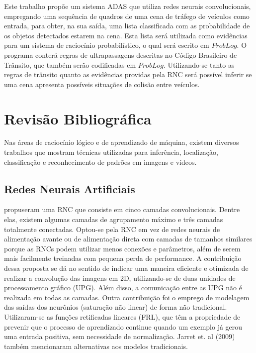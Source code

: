 \documentclass[
	12pt,				%
    oneside,			%
	a4paper,			%
	english,			%
	french,				%
	spanish,			%
	brazil,				%
	]{abntex2}
\begin{document}
Este trabalho propõe um sistema ADAS que utiliza redes neurais convolucionais, empregando uma sequência de quadros de uma cena de tráfego de veículos como entrada, para obter, na sua saída, uma lista classificada com as probabilidade de os objetos detectados estarem na cena. Esta lista será utilizada como evidências para um sistema de raciocínio probabilístico, o qual será escrito em $ProbLog$. O programa conterá regras de ultrapassagens descritas no Código Brasileiro de Trânsito, que também serão codificadas em $ProbLog$. Utilizando-se tanto as regras de trânsito quanto as evidências providas pela RNC será possível inferir se uma cena apresenta possíveis situações de colisão entre veículos.

%

\chapter{Revisão Bibliográfica}

Nas áreas de raciocínio lógico e de aprendizado de máquina, existem diversos trabalhos que mostram técnicas utilizadas para inferência, localização, classificação e reconhecimento de padrões em imagens e vídeos.

\section {Redes Neurais Artificiais}

 propuseram uma RNC que consiste em cinco camadas convolucionais. Dentre elas, existem algumas camadas de agrupamento máximo e três camadas totalmente conectadas. Optou-se pela RNC em vez de redes neurais de alimentação avante ou de alimentação direta com camadas de tamanhos similares porque as RNCs podem utilizar menos conexões e parâmetros, além de serem mais facilmente treinadas com pequena perda de performance. A contribuição dessa proposta se dá no sentido de indicar uma maneira eficiente e otimizada de realizar a convolução das imagens em 2D, utilizando-se de duas unidades de processamento gráfico (UPG). Além disso, a comunicação entre as UPG não é realizada em todas as camadas. Outra contribuição foi o emprego de modelagem das saídas dos neurônios (saturação não linear) de forma não tradicional. Utilizaram-se as funções retificadas lineares (FRL), que têm a propriedade de prevenir que o processo de aprendizado continue quando um exemplo já gerou uma entrada positiva, sem necessidade de normalização. Jarret et. al (2009) também mencionaram alternativas aos modelos tradicionais. 
\end{document}
